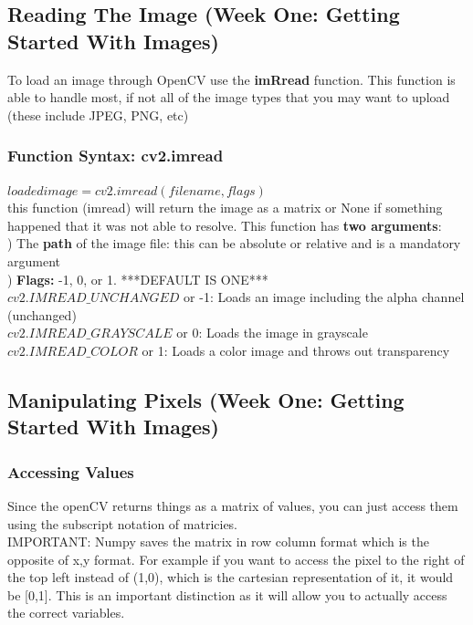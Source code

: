 \documentclass[fleqn]{article}
\begin{document}
    \subsection{Reading The Image (Week One: Getting Started With Images)}
    To load an image through OpenCV use the \textbf{imRread} function. This function is able to handle most, if not all of the image types that you may want to upload (these include JPEG, PNG, etc)

    \subsubsection{Function Syntax: cv2.imread}
    \textbf{$loaded image = cv2.imread(filename, flags)$}\\
    \tab this function (imread) will return the image as a matrix or None if something happened that it was not able to resolve.
    \tab This function has \textbf{two arguments}:\\
    \tab {}) The \textbf{path} of the image file: this can be absolute or relative and is a mandatory argument\\
    \tab {}) \textbf{Flags:} -1, 0, or 1. ***DEFAULT IS ONE***\\
    \indent \indent $cv2.IMREAD\_UNCHANGED$ or -1: Loads an image including the alpha channel (unchanged)\\
    \indent \indent   $cv2.IMREAD\_GRAYSCALE$ or 0: Loads the image in grayscale\\
    \indent \indent  $cv2.IMREAD\_COLOR$ or 1: Loads a color image and throws out transparency\\

    \newpage
    \clearpage
    \subsection{Manipulating Pixels (Week One: Getting Started With Images)}
    \subsubsection{Accessing Values}
    \indent Since the openCV returns things as a matrix of values, you can just access them using the subscript notation of matricies.\\
    IMPORTANT: Numpy saves the matrix in row column format which is the opposite of x,y format. For example if you want to access the pixel to the right of the top left instead of (1,0), which is the cartesian representation of it, it would be [0,1]. This is an important distinction as it will allow you to actually access the correct variables.\\
\end{document}
